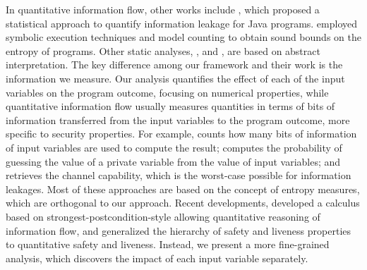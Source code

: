 In quantitative information flow, other works include , which proposed a statistical approach to quantify information leakage for Java programs.  employed symbolic execution techniques and model counting to obtain sound bounds on the entropy of programs.
Other static analyses, \eg,  and , are based on abstract interpretation.
%
%
The key difference among our framework and their work is the information we measure. Our analysis quantifies the effect of each of the input variables on the program outcome, focusing on numerical properties, while quantitative information flow usually measures quantities in terms of bits of information transferred from the input variables to the program outcome, more specific to security properties.
For example,  counts how many bits of information of input variables are used to compute the result;  computes the probability of guessing the value of a private variable from the value of input variables; and  retrieves the channel capability, which is the worst-case possible for information leakages. Most of these approaches are based on the concept of entropy measures, which are orthogonal to our approach.
Recent developments,  developed a calculus based on strongest-postcondition-style allowing quantitative reasoning of information flow, and  generalized the hierarchy of safety and liveness properties to quantitative safety and liveness.
Instead, we present a more fine-grained analysis, which discovers the impact of each input variable separately.


